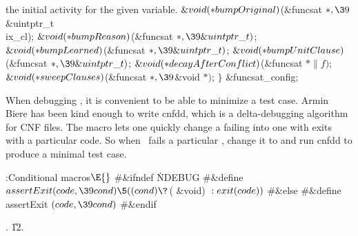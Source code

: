 {{{{{{the initial activity for the given variable.    }\6
${}\&{void}({*}\\{bumpOriginal}){}$(\&{funcsat} ${}{*},\39{}$\&{uintptr\_t} %
\\{ix\_cl});\6
${}\&{void}({*}\\{bumpReason}){}$(\&{funcsat} ${}{*},\39\&{uintptr\_t}){}$;\6
${}\&{void}({*}\\{bumpLearned}){}$(\&{funcsat} ${}{*},\39\&{uintptr\_t}){}$;\6
${}\&{void}({*}\\{bumpUnitClause}){}$(\&{funcsat} ${}{*},\39\&{uintptr\_t}){}$;%
\6
${}\&{void}({*}\\{decayAfterConflict}){}$(\&{funcsat} ${}{*}\|f){}$;\6
${}\&{void}({*}\\{sweepClauses}){}$(\&{funcsat} ${}{*},\39{}$\&{void}
${}{*}){}$;\2\6
${}\}{}$ \&{funcsat\_config};\par
\fi

When debugging \funcsat, it is convenient to be able to minimize a test
case. Armin Biere has been kind enough to write {\sc cnfdd}, which is a
delta-debugging algorithm for CNF files. The macro  lets one
quickly
change a failing  into one with exits with a particular code. So
when
\funcsat\ fails a particular , change it to  and
run {\sc cnfdd} to produce a minimal test case.

\Y\B\4:Conditional macros\X${}\E{}$\6
\8\#\&{ifndef} \.{NDEBUG}\6
\8\#\&{define} ${}\\{assertExit}(\\{code},\39\\{cond}) \5((\\{cond})\?{}$(%
\&{void}) ${}:\\{exit}(\\{code})){}$\6
\8\#\&{else}\6
\8\#\&{define} \\{assertExit} \5${}(\\{code},\39\\{cond}){}$\6
\8\#\&{endif}\par
{}.
\U12.\fi

}}}}}
